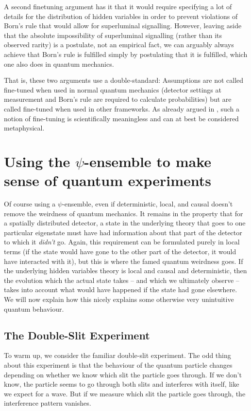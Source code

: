 \documentclass[superscriptaddress,twocolumn,floatfix,nofootinbib]{revtex4-2}
\begin{document}
A second finetuning argument \cite{Wood2015FineTuning} has it that it would require specifying a lot of details for the distribution of hidden variables in order to prevent violations of Born's rule that would allow for superluminal signalling. However, leaving aside that the absolute impossibility of superluminal signalling (rather than its observed rarity) is a postulate, not an empirical fact, we can arguably always achieve that Born's rule is fulfilled simply by postulating that it is fulfilled, which one also does in quantum mechanics. 

That is, these two arguments use a double-standard: Assumptions are not called fine-tuned when used in normal quantum mechanics (detector settings at measurement and Born's rule are required to calculate probabilities) but are called fine-tuned when used in other frameworks. As already argued in \cite{Hossenfelder2020SuperdeterminismGuide}, such a notion of fine-tuning is scientifically meaningless and can at best be considered metaphysical. 

\section{Using the \texorpdfstring{$\psi$}{psi}-ensemble to make sense of quantum experiments}
\label{exp}
Of course using a $\psi$-ensemble, even if deterministic, local, and causal doesn't remove the weirdness of quantum mechanics. It remains in the property that for a spatially distributed detector, a state in the underlying theory that goes to one particular eigenstate must have had information about that part of the detector to which it \emph{didn't} go. Again, this requirement can be formulated purely in local terms (if the state would have gone to the other part of the detector, it would have interacted with it), but this is where the famed quantum weirdness goes. If the underlying hidden variables theory is local and causal and deterministic, then the evolution which the actual state takes -- and which we ultimately observe -- takes into account what would have happened if the state had gone elsewhere. We will now explain how this nicely explains some otherwise very unintuitive quantum behaviour.

\subsection{The Double-Slit Experiment}

To warm up, we consider the familiar double-slit experiment. The odd thing about this experiment is that the behaviour of the quantum particle changes depending on whether we know which slit the particle goes through. If we don't know, the particle seems to go through both slits and interferes with itself, like we expect for a wave. But if we measure which slit the particle goes through, the interference pattern vanishes. 
\end{document}
